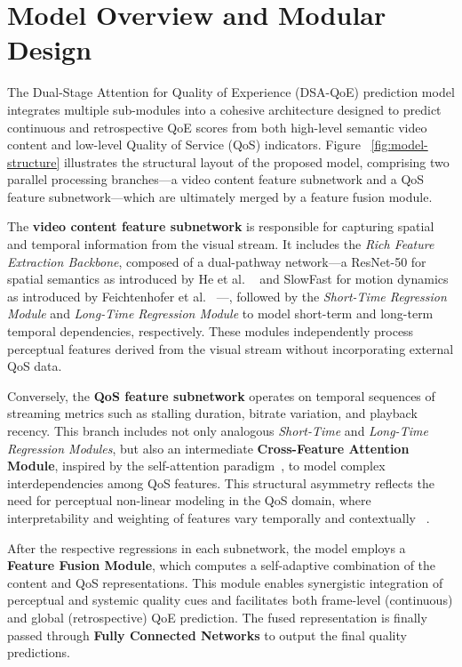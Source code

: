 \section{Model Overview and Modular Design}

The Dual-Stage Attention for Quality of Experience (DSA-QoE) prediction model integrates multiple sub-modules into a cohesive architecture designed to predict continuous and retrospective QoE scores from both high-level semantic video content and low-level Quality of Service (QoS) indicators. Figure ~\ref{fig:model-structure} illustrates the structural layout of the proposed model, comprising two parallel processing branches---a video content feature subnetwork and a QoS feature subnetwork---which are ultimately merged by a feature fusion module.

The \textbf{video content feature subnetwork} is responsible for capturing spatial and temporal information from the visual stream. It includes the \textit{Rich Feature Extraction Backbone}, composed of a dual-pathway network---a ResNet-50 for spatial semantics as introduced by He et al. ~\cite{he2016deep} and SlowFast for motion dynamics as introduced by Feichtenhofer et al. ~\cite{feichtenhofer2019slowfast}---, followed by the \textit{Short-Time Regression Module} and \textit{Long-Time Regression Module} to model short-term and long-term temporal dependencies, respectively. These modules independently process perceptual features derived from the visual stream without incorporating external QoS data.

Conversely, the \textbf{QoS feature subnetwork} operates on temporal sequences of streaming metrics such as stalling duration, bitrate variation, and playback recency. This branch includes not only analogous \textit{Short-Time} and \textit{Long-Time Regression Modules}, but also an intermediate \textbf{Cross-Feature Attention Module}, inspired by the self-attention paradigm~\cite{vaswani2017attention}, to model complex interdependencies among QoS features. This structural asymmetry reflects the need for perceptual non-linear modeling in the QoS domain, where interpretability and weighting of features vary temporally and contextually ~\cite{jia2024continuous}.

After the respective regressions in each subnetwork, the model employs a \textbf{Feature Fusion Module}, which computes a self-adaptive combination of the content and QoS representations. This module enables synergistic integration of perceptual and systemic quality cues and facilitates both frame-level (continuous) and global (retrospective) QoE prediction. The fused representation is finally passed through \textbf{Fully Connected Networks} to output the final quality predictions.

